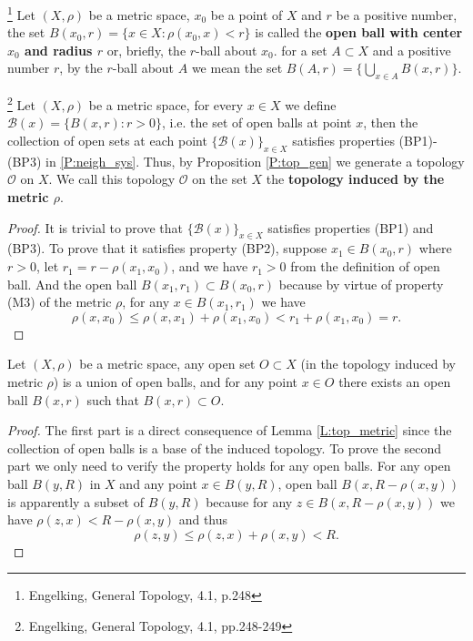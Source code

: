 \begin{definition}
\footnote{Engelking, General Topology, 4.1, p.248}
Let $(X,\rho)$ be a metric space, $x_0$ be a point of $X$ and $r$ be a positive
number, the set $B(x_0,r)=\{x\in X: \rho(x_0,x)<r\}$ is called the 
\textbf{open ball with center $x_0$ and radius $r$} 
or, briefly, the $r$-ball
about $x_0$. for a set $A\subset X$ and a positive number $r$, by the $r$-ball
about $A$ we mean the set $B(A,r)=\{\bigcup_{x\in A} B(x,r)\}$.
\end{definition}


\begin{lemma} \label{L:top_metric}
\footnote{Engelking, General Topology, 4.1, pp.248-249}
Let $(X,\rho)$ be a metric space, 
for every $x\in X$ we define $\mathcal{B}(x)=\{B(x,r):r>0\}$, i.e. the
set of open balls at point $x$, then the collection of open sets at each point
$\{\mathcal{B}(x)\}_{x\in X}$ satisfies properties (BP1)-(BP3) in 
\ref{P:neigh_sys}. 
Thus, by Proposition \ref{P:top_gen} we generate a topology
$\mathcal{O}$ on $X$. We call this topology $\mathcal{O}$ on the set $X$ the
\textbf{topology induced by the metric $\rho$}.
\end{lemma}
\begin{proof}
It is trivial to prove that $\{\mathcal{B}(x)\}_{x\in X}$ satisfies properties
(BP1) and (BP3). To prove that it satisfies property (BP2), suppose 
$x_1\in B(x_0,r)$ where $r>0$, let $r_1=r-\rho(x_1,x_0)$, and we have $r_1>0$ 
from the definition of open ball. And the open ball $B(x_1,r_1)\subset B(x_0,r)$
because by virtue of property (M3) of the metric $\rho$, for any 
$x\in B(x_1,r_1)$ we have
\[
  \rho(x,x_0) \le \rho(x,x_1)+\rho(x_1,x_0) < r_1+\rho(x_1,x_0) = r.
\]
\end{proof}


\begin{proposition}
Let $(X,\rho)$ be a metric space, any open set $O\subset X$ (in the topology 
induced by metric $\rho$) is a union of open balls, and for any point $x\in O$ 
there exists an open ball $B(x,r)$ such that $B(x,r)\subset O$.
\end{proposition}
\begin{proof}
The first part is a direct consequence of Lemma \ref{L:top_metric} since the
collection of open balls is a base of the induced topology. 
To prove the second part we only need
to verify the property holds for any open balls. For any open ball $B(y,R)$ in
$X$ and any point $x\in B(y,R)$, open ball $B(x,R-\rho(x,y))$ is apparently a
subset of $B(y,R)$ because for any $z\in B(x,R-\rho(x,y))$ we have 
$\rho(z,x)<R-\rho(x,y)$ and thus
\[
  \rho(z,y) \leq \rho(z,x)+\rho(x,y) < R.
\]
\end{proof}


